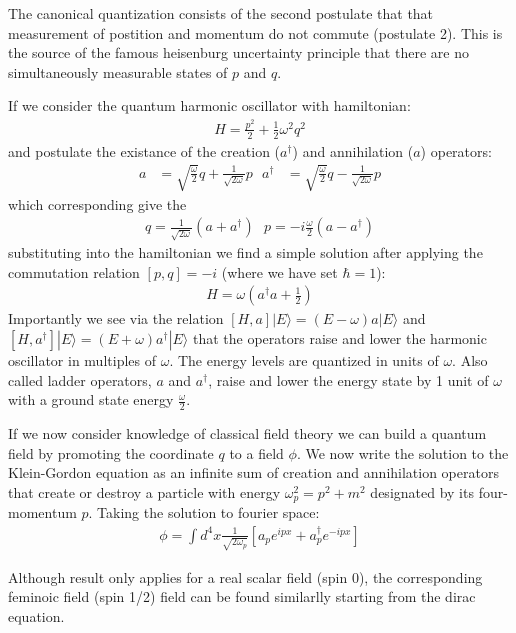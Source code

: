 The canonical quantization consists of the second postulate that that measurement of postition
and momentum do not commute (postulate 2). This is the source of the famous heisenburg uncertainty
principle that there are no simultaneously measurable states of $p$ and $q$. 

If we consider the quantum harmonic oscillator with hamiltonian:
\begin{align*}
H = \frac{p^2}{2} + \frac{1}{2}\omega^2 q^2
\end{align*}
and postulate the existance of the creation ($a^\dagger$) and annihilation ($a$) operators:
\begin{align*}
a &= \sqrt{\frac{\omega}{2}}q + \frac{1}{\sqrt{2\omega}}p \text{  } a^\dagger &= \sqrt{\frac{\omega}{2}}q - \frac{1}{\sqrt{2\omega}}p 
\end{align*}
which corresponding give the 
\begin{align*}
q = \frac{1}{\sqrt{2\omega}} (a + a^\dagger) \text{  } p = -i \frac{\omega}{2}( a - a^\dagger) 
\end{align*}
 substituting into the hamiltonian we find a simple solution after applying
the commutation relation $[p,q]=-i$ (where we have set $\hbar=1$):
\begin{align*}
H =  \omega(a^\dagger a + \frac{1}{2}) 
\end{align*}
Importantly we see via the relation $[H,a]|E\rangle = (E-\omega)a|E\rangle$ and 
$[H,a^\dagger]|E\rangle = (E+\omega)a^\dagger|E\rangle$ that the operators raise and 
lower the harmonic oscillator in multiples of $\omega$. The energy levels are quantized 
in units of $\omega$. Also called ladder operators, $a$ and $a^\dagger$, raise and lower
the energy state by 1 unit of $\omega$ with a ground state energy $\frac{\omega}{2}$. 

If we now consider knowledge of classical field theory we can build a quantum field by
promoting the coordinate $q$ to a field $\phi$. We now write
the solution to the Klein-Gordon equation as an infinite sum of creation and 
annihilation operators that create or destroy a particle with energy $\omega_p^2 =
p^2 + m^2$ designated by its four-momentum $p$. Taking the solution to fourier space:
\begin{align*}
\phi = \int d^4x \frac{1}{\sqrt{2\omega_{p}}} \left [  a_p e^{ipx} + a_p^\dagger e^{-ipx} \right ]
\end{align*} 

Although result only applies for a real scalar field (spin 0), the corresponding feminoic field (spin 1/2)
field can be found similarlly starting from the dirac equation. 

